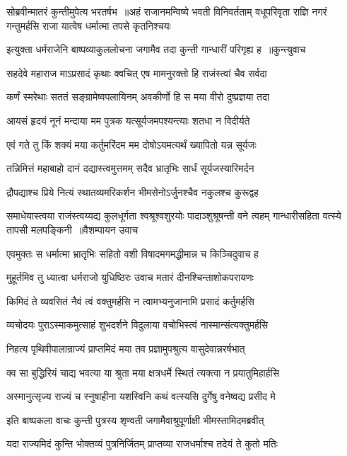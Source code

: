 सोब्रवीन्मातरं कुन्तीमुपेत्य भरतर्षभ ॥अहं राजानमन्विष्ये भवती विनिवर्तताम्
\twolineshloka
{वधूपरिवृता राज्ञि नगरं गन्तुमर्हसि}
{राजा यात्वेष धर्मात्मा तपसे कृतनिश्चयः}


\threelineshloka
{इत्युक्ता धर्मराजेनि बाष्पव्याकुललोचना}
{जगामैव तदा कुन्ती गान्धारीं परिगृह्य ह ॥कुन्त्युवाच}
{}


\twolineshloka
{सहदेवे महाराज माऽप्रसादं कृथाः क्वचित्}
{एष मामनुरक्तो हि राजंस्त्वां चैव सर्वदा}


\twolineshloka
{कर्णं स्मरेथाः सततं सङ्ग्रामेष्वपलायिनम्}
{अवकीर्णो हि स मया वीरो दुष्प्रज्ञया तदा}


\twolineshloka
{आयसं हृदयं नूनं मन्दाया मम पुत्रक}
{यत्सूर्यजमपश्यन्त्याः शतधा न विदीर्यते}


\twolineshloka
{एवं गते तु किं शक्यं मया कर्तुमरिंदम}
{मम दोषोऽयमत्यर्थं ख्यापितो यन्न सूर्यजः}


\twolineshloka
{तन्निमित्तं महाबाहो दानं दद्यास्त्वमुत्तमम्}
{सदैव भ्रातृभिः सार्धं सूर्यजस्यारिमर्दन}


\twolineshloka
{द्रौपद्याश्च प्रिये नित्यं स्थातव्यमरिकर्शन}
{भीमसेनोऽर्जुनश्चैव नकुलश्च कुरूद्वह}


\fourlineindentedshloka
{समाधेयास्त्वया राजंस्त्वय्यद्य कुलधूर्गता}
{श्वश्रूश्वशुरयोः पादाञ्शुश्रूषन्ती वने त्वहम्}
{गान्धारीसहिता वत्स्ये तापसी मलपङ्किनी ॥वैशम्पायन उवाच}
{}


\twolineshloka
{एवमुक्तः स धर्मात्मा भ्रातृभिः सहितो वशी}
{विषादमगमद्धीमान्न च किञ्चिदुवाच ह}


\twolineshloka
{मुहूर्तमिव तु ध्यात्वा धर्मराजो युधिष्ठिरः}
{उवाच मतारं दीनश्चिन्ताशोकपरायणः}


\twolineshloka
{किमिदं ते व्यवसितं नैवं त्वं वक्तुमर्हसि}
{न त्वामभ्यनुजानामि प्रसादं कर्तुमर्हसि}


\twolineshloka
{व्यचोदयः पुराऽस्माकमुत्साहं शुभदर्शने}
{विदुलाया वचोभिस्त्वं नास्मान्संत्यक्तुमर्हसि}


\twolineshloka
{निहत्य पृथिवीपालान्राज्यं प्राप्तमिदं मया}
{तव प्रज्ञामुपश्रुत्य वासुदेवान्नरर्षभात्}


\twolineshloka
{क्व सा बुद्धिरियं चाद्य भवत्या या श्रुता मया}
{क्षत्रधर्मे स्थितं त्यक्त्वा न प्रयातुमिहार्हसि}


\twolineshloka
{अस्मानुत्सृज्य राज्यं च स्नुषाहीना यशस्विनि}
{कथं वत्स्यसि दुर्गेषु वनेष्वद्य प्रसीद मे}


\twolineshloka
{इति बाष्पकला वाचः कुन्ती पुत्रस्य शृण्वती}
{जगामैवाश्रुपूर्णाक्षी भीमस्तामिदमब्रवीत्}


\twolineshloka
{यदा राज्यमिदं कुन्ति भोक्तव्यं पुत्रनिर्जितम्}
{प्राप्तव्या राजधर्माश्च तदेयं ते कुतो मतिः}


